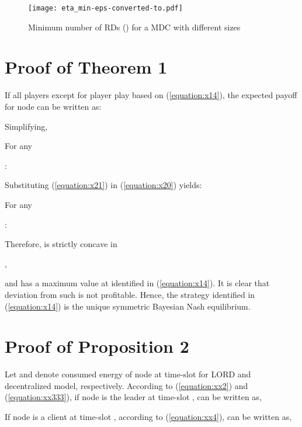 \documentclass[journal,12pt, onecolumn]{IEEEtran}
\begin{document}
\begin{figure}
\begin{center}
\texttt{[image: eta\_min-eps-converted-to.pdf]}
\end{center}
\caption{Minimum number of RDs () for a MDC with different sizes}
\label{eta}
\end{figure}

\section{Proof of Theorem 1}
\label{p_t1}
If all players except for player  play based on (\ref{equation:x14}), the expected payoff for node  can be written as:

\begin{small}

\end{small}
Simplifying,
\begin{small}

\end{small}
For any \begin{small}
:

\end{small}
Substituting (\ref{equation:x21}) in (\ref{equation:x20}) yields:
\begin{small}

\end{small}
For any \begin{small} :

\end{small}

Therefore,  is strictly concave in \begin{small}
,
\end{small}
and has a maximum value at  identified in (\ref{equation:x14}). It is clear that deviation from such  is not profitable. Hence, the strategy identified in (\ref{equation:x14}) is the unique symmetric Bayesian Nash equilibrium.

\section{Proof of Proposition 2}
\label{p_p2}
Let  and  denote consumed energy of node  at time-slot  for LORD and decentralized model, respectively. According to (\ref{equation:xx2}) and (\ref{equation:xx333}), if node  is the leader at time-slot 
,  can be written as,


If node  is a client at time-slot , according to (\ref{equation:xx4}),  can be written as,
\end{document}
